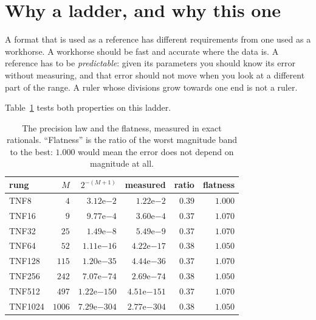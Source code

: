 \documentclass[11pt]{article}
\theoremstyle{definition}
\begin{document}
\section{Why a ladder, and why this one}\label{sec:ruler}

A format that is used as a reference has different requirements from one used as
a workhorse. A workhorse should be fast and accurate where the data is. A
reference has to be \emph{predictable}: given its parameters you should know its
error without measuring, and that error should not move when you look at a
different part of the range. A ruler whose divisions grow towards one end is not
a ruler.

Table~\ref{tab:law} tests both properties on this ladder.

\begin{table}[t]\centering
\caption{The precision law and the flatness, measured in exact rationals.
``Flatness'' is the ratio of the worst magnitude band to the best: $1.000$ would
mean the error does not depend on magnitude at all.}
\label{tab:law}
\begin{tabular}{lrrrrr}
\toprule
rung & $M$ & $2^{-(M+1)}$ & measured & ratio & flatness \\
\midrule
TNF8    & $4$    & $3.12\mathrm{e}{-2}$   & $1.22\mathrm{e}{-2}$   & $0.39$ & $1.000$ \\
TNF16   & $9$    & $9.77\mathrm{e}{-4}$   & $3.60\mathrm{e}{-4}$   & $0.37$ & $1.070$ \\
TNF32   & $25$   & $1.49\mathrm{e}{-8}$   & $5.49\mathrm{e}{-9}$   & $0.37$ & $1.070$ \\
TNF64   & $52$   & $1.11\mathrm{e}{-16}$  & $4.22\mathrm{e}{-17}$  & $0.38$ & $1.050$ \\
TNF128  & $115$  & $1.20\mathrm{e}{-35}$  & $4.44\mathrm{e}{-36}$  & $0.37$ & $1.070$ \\
TNF256  & $242$  & $7.07\mathrm{e}{-74}$  & $2.69\mathrm{e}{-74}$  & $0.38$ & $1.050$ \\
TNF512  & $497$  & $1.22\mathrm{e}{-150}$ & $4.51\mathrm{e}{-151}$ & $0.37$ & $1.070$ \\
TNF1024 & $1006$ & $7.29\mathrm{e}{-304}$ & $2.77\mathrm{e}{-304}$ & $0.38$ & $1.050$ \\
\bottomrule
\end{tabular}
\end{table}
\end{document}
